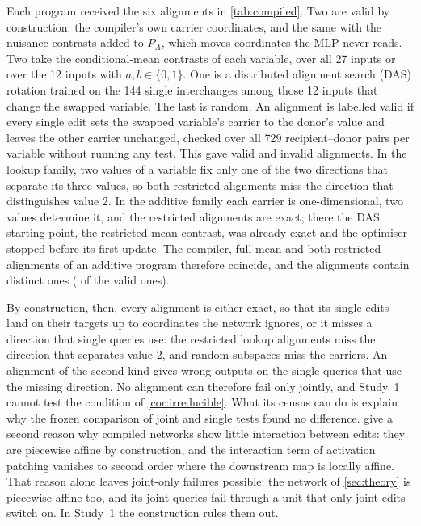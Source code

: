 Each program received the six alignments in \cref{tab:compiled}. Two are valid by construction: the compiler's
own carrier coordinates, and the same with the nuisance contrasts added to $P_A$, which moves coordinates the MLP
never reads. Two take the conditional-mean contrasts of each variable, over all 27 inputs or over the 12 inputs
with $a,b\in\{0,1\}$. One is a distributed alignment search (DAS) rotation \citep{geiger2024das} trained on the 144
single interchanges among those 12 inputs that change the swapped variable. The last is random. An alignment is
labelled valid if every single edit sets the swapped variable's carrier to the donor's value and leaves the other
carrier unchanged, checked over all 729 recipient--donor pairs per variable without running any test. This gave
\CmpValid{} valid and \CmpInvalid{} invalid alignments. In the lookup family, two values of a variable fix only one
of the two directions that separate its three values, so both restricted alignments miss the direction that
distinguishes value 2. In the additive family each carrier is one-dimensional, two values determine it, and the
restricted alignments are exact; there the DAS starting point, the restricted mean contrast, was already exact and
the optimiser stopped before its first update. The compiler, full-mean and both restricted alignments of an
additive program therefore coincide, and the \CmpCandidates{} alignments contain \CmpDistinct{} distinct ones
(\CmpDistinctValid{} of the \CmpValid{} valid ones).

By construction, then, every alignment is either exact, so that its single edits land on their targets up to
coordinates the network ignores, or it misses a direction that single queries use: the restricted lookup alignments
miss the direction that separates value 2, and random subspaces miss the carriers. An alignment of the second kind
gives wrong outputs on the single queries that use the missing direction. No alignment can therefore fail only
jointly, and Study~1 cannot test the condition of \cref{cor:irreducible}. What its census can do is explain why the
frozen comparison of joint and single tests found no difference.
\citet{vaidyanathan2026mediators} give a second reason why compiled networks show little interaction between edits:
they are piecewise affine by construction, and the interaction term of activation patching vanishes to second order
where the downstream map is locally affine. That reason alone leaves joint-only failures possible: the network of
\cref{sec:theory} is piecewise affine too, and its joint queries fail through a unit that only joint edits switch
on. In Study~1 the construction rules them out.

